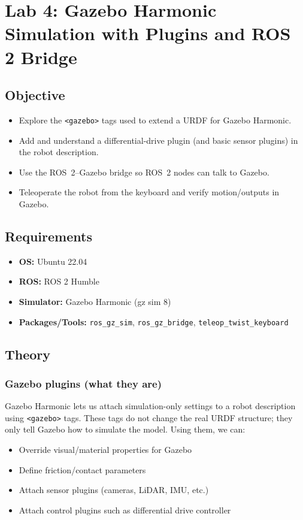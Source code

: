 \section{Lab 4: Gazebo Harmonic Simulation with Plugins and ROS 2 Bridge}

\subsection{Objective}
\begin{itemize}
	\item Explore the \texttt{<gazebo>} tags used to extend a URDF for Gazebo Harmonic.
	\item Add and understand a differential-drive plugin (and basic sensor plugins) in the robot description.
	\item Use the ROS~2--Gazebo bridge so ROS~2 nodes can talk to Gazebo.
	\item Teleoperate the robot from the keyboard and verify motion/outputs in Gazebo.
\end{itemize}

\subsection{Requirements}
\begin{itemize}
	\item \textbf{OS:} Ubuntu 22.04
	\item \textbf{ROS:} ROS 2 Humble
	\item \textbf{Simulator:} Gazebo Harmonic (gz sim 8)
	\item \textbf{Packages/Tools:} \texttt{ros\_gz\_sim}, \texttt{ros\_gz\_bridge}, \texttt{teleop\_twist\_keyboard}
\end{itemize}

\subsection{Theory}

\subsubsection{Gazebo plugins (what they are)}

Gazebo Harmonic lets us attach simulation-only settings to a robot description using \texttt{<gazebo>} tags. These tags do not change the real URDF structure; they only tell Gazebo how to simulate the model. Using them, we can:
\begin{itemize}
	\item Override visual/material properties for Gazebo
	\item Define friction/contact parameters
	\item Attach sensor plugins (cameras, LiDAR, IMU, etc.)
	\item Attach control plugins such as differential drive controller
\end{itemize}


